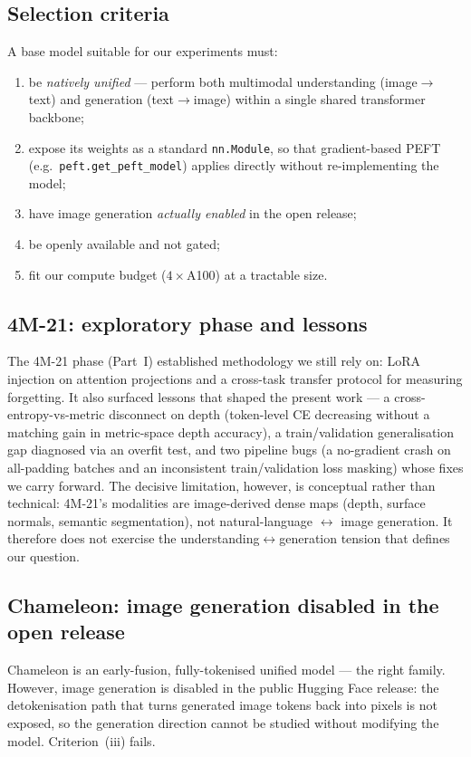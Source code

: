 \subsection{Selection criteria}
A base model suitable for our experiments must:
\begin{enumerate}
    \item be \emph{natively unified} --- perform both multimodal understanding
          (image$\rightarrow$text) and generation (text$\rightarrow$image)
          within a single shared transformer backbone;
    \item expose its weights as a standard \texttt{nn.Module}, so that
          gradient-based PEFT (e.g.\ \texttt{peft.get\_peft\_model}) applies
          directly without re-implementing the model;
    \item have image generation \emph{actually enabled} in the open release;
    \item be openly available and not gated;
    \item fit our compute budget ($4\times$A100) at a tractable size.
\end{enumerate}

\subsection{4M-21: exploratory phase and lessons}
The 4M-21 phase (Part~I) established methodology we still rely on: LoRA
injection on attention projections and a cross-task transfer protocol for
measuring forgetting. It also surfaced lessons that shaped the present work ---
a cross-entropy-vs-metric disconnect on depth (token-level CE decreasing
without a matching gain in metric-space depth accuracy), a train/validation
generalisation gap diagnosed via an overfit test, and two pipeline bugs (a
no-gradient crash on all-padding batches and an inconsistent train/validation
loss masking) whose fixes we carry forward. The decisive limitation, however,
is conceptual rather than technical: 4M-21's modalities are image-derived dense
maps (depth, surface normals, semantic segmentation), not natural-language
$\leftrightarrow$ image generation. It therefore does not exercise the
understanding$\leftrightarrow$generation tension that defines our question.

\subsection{Chameleon: image generation disabled in the open release}
Chameleon \citep{chameleon2024} is an early-fusion, fully-tokenised unified
model --- the right family. However, image generation is disabled in the public
Hugging Face release: the detokenisation path that turns generated image tokens
back into pixels is not exposed, so the generation direction cannot be studied
without modifying the model. Criterion~(iii) fails.

